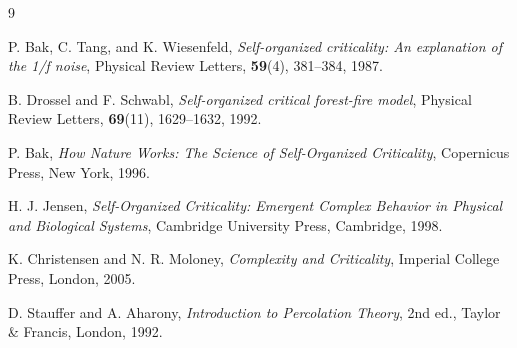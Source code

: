 \documentclass[12pt, a4paper]{article}
\begin{document}

\begin{thebibliography}{9}

P. Bak, C. Tang, and K. Wiesenfeld,
\textit{Self-organized criticality: An explanation of the 1/f noise},
Physical Review Letters, \textbf{59}(4), 381--384, 1987.

B. Drossel and F. Schwabl,
\textit{Self-organized critical forest-fire model},
Physical Review Letters, \textbf{69}(11), 1629--1632, 1992.

P. Bak,
\textit{How Nature Works: The Science of Self-Organized Criticality},
Copernicus Press, New York, 1996.

H. J. Jensen,
\textit{Self-Organized Criticality: Emergent Complex Behavior in Physical and
Biological Systems},
Cambridge University Press, Cambridge, 1998.

K. Christensen and N. R. Moloney,
\textit{Complexity and Criticality},
Imperial College Press, London, 2005.

D. Stauffer and A. Aharony,
\textit{Introduction to Percolation Theory}, 2nd ed.,
Taylor \& Francis, London, 1992.

\end{thebibliography}
\end{document}
